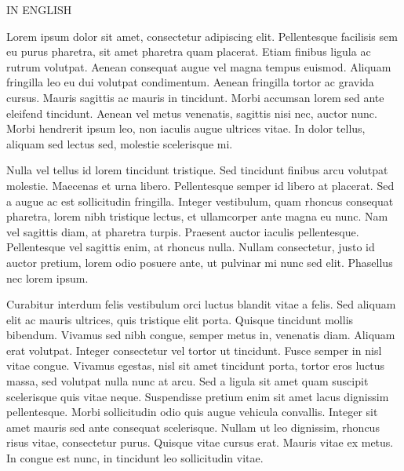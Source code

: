 \justify
IN ENGLISH

Lorem ipsum dolor sit amet, consectetur adipiscing elit. Pellentesque facilisis sem eu purus pharetra, sit amet pharetra quam placerat. Etiam finibus ligula ac rutrum volutpat. Aenean consequat augue vel magna tempus euismod. Aliquam fringilla leo eu dui volutpat condimentum. Aenean fringilla tortor ac gravida cursus. Mauris sagittis ac mauris in tincidunt. Morbi accumsan lorem sed ante eleifend tincidunt. Aenean vel metus venenatis, sagittis nisi nec, auctor nunc. Morbi hendrerit ipsum leo, non iaculis augue ultrices vitae. In dolor tellus, aliquam sed lectus sed, molestie scelerisque mi.

Nulla vel tellus id lorem tincidunt tristique. Sed tincidunt finibus arcu volutpat molestie. Maecenas et urna libero. Pellentesque semper id libero at placerat. Sed a augue ac est sollicitudin fringilla. Integer vestibulum, quam rhoncus consequat pharetra, lorem nibh tristique lectus, et ullamcorper ante magna eu nunc. Nam vel sagittis diam, at pharetra turpis. Praesent auctor iaculis pellentesque. Pellentesque vel sagittis enim, at rhoncus nulla. Nullam consectetur, justo id auctor pretium, lorem odio posuere ante, ut pulvinar mi nunc sed elit. Phasellus nec lorem ipsum.

Curabitur interdum felis vestibulum orci luctus blandit vitae a felis. Sed aliquam elit ac mauris ultrices, quis tristique elit porta. Quisque tincidunt mollis bibendum. Vivamus sed nibh congue, semper metus in, venenatis diam. Aliquam erat volutpat. Integer consectetur vel tortor ut tincidunt. Fusce semper in nisl vitae congue. Vivamus egestas, nisl sit amet tincidunt porta, tortor eros luctus massa, sed volutpat nulla nunc at arcu. Sed a ligula sit amet quam suscipit scelerisque quis vitae neque. Suspendisse pretium enim sit amet lacus dignissim pellentesque. Morbi sollicitudin odio quis augue vehicula convallis. Integer sit amet mauris sed ante consequat scelerisque. Nullam ut leo dignissim, rhoncus risus vitae, consectetur purus. Quisque vitae cursus erat. Mauris vitae ex metus. In congue est nunc, in tincidunt leo sollicitudin vitae.